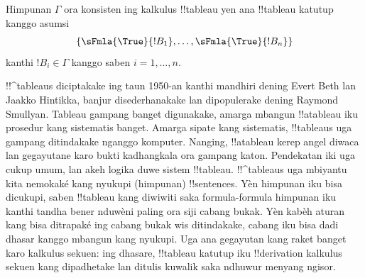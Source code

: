 \documentclass[../../../include/open-logic-section]{subfiles}
\begin{document}
Himpunan $\Gamma$ ora konsisten ing kalkulus !!{tableau} yen ana
!!{tableau} katutup kanggo asumsi
\[
\{\sFmla{\True}{!B_1}, \dots, \sFmla{\True}{!B_n}\} 
\]
kanthi $!B_i \in \Gamma$ kanggo saben $i=1,\dots,n$.

!!^{tableau}s diciptakake ing taun 1950-an kanthi mandhiri dening Evert
Beth lan Jaakko Hintikka, banjur disederhanakake lan dipopulerake dening
Raymond Smullyan. Tableau gampang banget digunakake, amarga mbangun
!!a{tableau} iku prosedur kang sistematis banget. Amarga sipate kang
sistematis, !!{tableau}s uga gampang ditindakake nganggo komputer.
Nanging, !!a{tableau} kerep angel diwaca lan gegayutane karo bukti
kadhangkala ora gampang katon. Pendekatan iki uga cukup umum, lan akeh
logika duwe sistem !!{tableau}. !!^{tableau}s uga mbiyantu kita nemokaké 
kang nyukupi (himpunan) !!{sentence}s. Yèn himpunan iku bisa dicukupi,
saben !!{tableau} kang diwiwiti saka formula-formula himpunan iku
kanthi tandha bener nduwèni paling ora siji cabang bukak.
Yèn kabèh aturan kang bisa ditrapaké ing cabang bukak wis ditindakake,
cabang iku bisa dadi dhasar kanggo mbangun
 kang nyukupi.
Uga ana gegayutan kang raket banget karo kalkulus sekuen: ing dhasare,
!!{tableau} katutup iku !!{derivation} kalkulus sekuen kang dipadhetake
lan ditulis kuwalik saka ndhuwur menyang ngisor.
\end{document}
